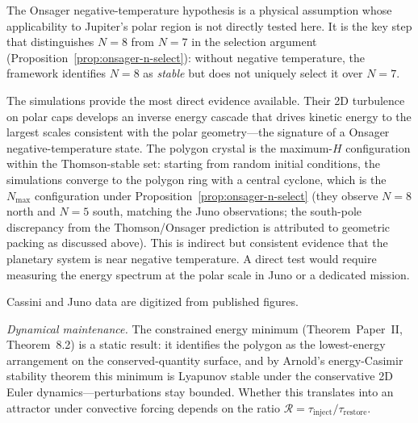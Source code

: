 The Onsager negative-temperature hypothesis is a physical assumption
whose applicability to Jupiter's polar region is not directly tested
here.  It is the key step that distinguishes $N = 8$ from $N = 7$
in the selection argument (Proposition~\ref{prop:onsager-n-select}):
without negative temperature, the framework identifies $N = 8$ as
\emph{stable} but does not uniquely select it over $N = 7$.

The \citet{Siegelman2022} simulations provide the most direct evidence
available.  Their 2D turbulence on polar caps develops an inverse energy
cascade that drives kinetic energy to the largest scales consistent with
the polar geometry---the signature of a Onsager negative-temperature
state.  The polygon crystal is the maximum-$H$ configuration within
the Thomson-stable set: starting from random initial conditions, the
simulations converge to the polygon ring with a central cyclone, which
is the $N_{\max}$ configuration under Proposition~\ref{prop:onsager-n-select}
(they observe $N = 8$ north and $N = 5$ south, matching the Juno
observations; the south-pole discrepancy from the Thomson/Onsager
prediction is attributed to geometric packing as discussed above).
This is indirect but consistent evidence that the planetary system is
near negative temperature.  A direct test would require measuring the
energy spectrum at the polar scale in Juno or a dedicated mission.

Cassini and Juno data are digitized from published figures.

\emph{Dynamical maintenance.}%
\label{sec:dynamical-maintenance}
The constrained energy minimum (Theorem~Paper~II, Theorem~8.2) is
a static result: it identifies the polygon as the lowest-energy
arrangement on the conserved-quantity surface, and by Arnold's energy-Casimir
stability theorem \citep{Arnold1966} this minimum is Lyapunov stable
under the conservative 2D Euler dynamics---perturbations stay bounded.
Whether this translates into an attractor under convective forcing
depends on the ratio $\mathcal{R} = \tau_{\mathrm{inject}}/\tau_{\mathrm{restore}}$.

